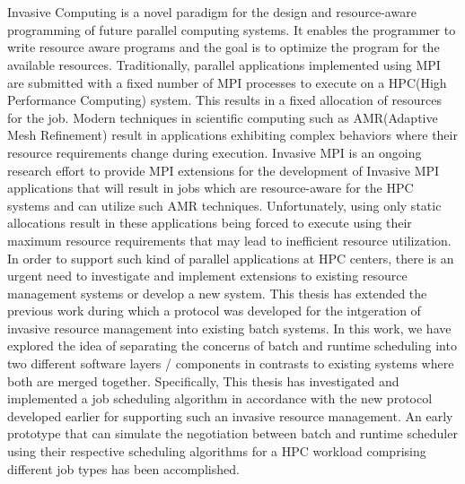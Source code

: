 \chapter{\abstractname}
Invasive Computing is a novel paradigm for the design and resource-aware programming of future parallel computing systems. It enables the programmer to write resource aware programs and the goal is to optimize the program for the available resources. Traditionally, parallel applications implemented using MPI are submitted with a fixed number of MPI processes to execute on a HPC(High Performance Computing) system. This results in a fixed allocation of resources for the job. Modern techniques in scientific computing such as AMR(Adaptive Mesh Refinement) result in applications exhibiting complex behaviors where their resource requirements change during execution. Invasive MPI is an ongoing research effort to provide MPI extensions for the development of Invasive MPI applications that will result in jobs which are resource-aware for the HPC systems and can utilize such AMR techniques. Unfortunately, using only static allocations result in these applications being forced to execute using their maximum resource requirements that may lead to inefficient resource utilization. In order to support such kind of parallel applications at HPC centers, there is an urgent need to investigate and implement extensions to existing resource management systems or develop a new system. This thesis has extended the previous work during which a protocol was developed for the intgeration of invasive resource management into existing batch systems. In this work, we have explored the idea of separating the concerns of batch and runtime scheduling into two different software layers / components in contrasts to existing systems where both are merged together. Specifically, This thesis has investigated and implemented a job scheduling algorithm in accordance with the new protocol developed earlier for supporting such an invasive resource management. An early prototype that can simulate the negotiation between batch and runtime scheduler using their respective scheduling algorithms for a HPC workload comprising different job types has been accomplished.\par



